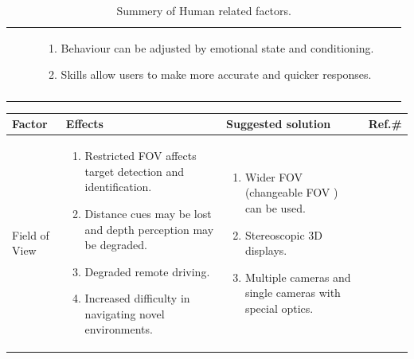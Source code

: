 \begin{longtable}{p{2.5cm} p{5cm} p{5cm} p{1cm}}
\begin{enumerate}
           \end{enumerate} &
            \begin{enumerate}
            \item Behaviour can be adjusted by emotional state and conditioning.
            \item  Skills allow users to make more accurate and quicker responses.
            \end{enumerate} &  \cite{pavlov1927conditional} \cite{Bowman:2004:UIT:993837} \cite{fitts1967human} \\
            
    \caption{Summery of Human related factors.}
    \label{table:human factors}
    \end{longtable}

 \begin{longtable}{p{2.5cm} p{5cm} p{5cm} p{1cm}}
    \hline
      \textbf{Factor} & \textbf{Effects} & \textbf{Suggested solution} & \textbf{Ref.\#}\\           
            
        \hline 
        Field of View  &
           \begin{enumerate}
           \item Restricted FOV affects  target detection and identification.
           \item Distance cues may be lost and depth perception may be degraded.
           \item Degraded remote driving.
           \item Increased difficulty in navigating novel environments.
           \end{enumerate} &
            \begin{enumerate}
            \item Wider FOV (changeable FOV ) can be used. 
            \item Stereoscopic 3D displays.
            \item Multiple cameras and single cameras with special optics.
            \end{enumerate} &  \cite{Chen2014} \cite{smyth2000indirect} \cite{van2003image} \cite{Chen2007HumanPI} \cite{Suzuki2014} \\
        \hline
          

\end{longtable}
